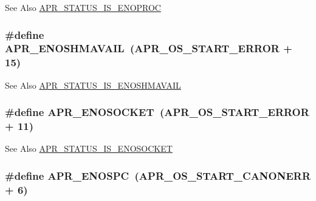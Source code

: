 \begin{DoxySeeAlso}{See Also}
\hyperlink{group___a_p_r___s_t_a_t_u_s___i_s_ga566f4c9b9db8a0c31199a938bdc4e38a}{A\-P\-R\-\_\-\-S\-T\-A\-T\-U\-S\-\_\-\-I\-S\-\_\-\-E\-N\-O\-P\-R\-O\-C} 
\end{DoxySeeAlso}
\hypertarget{group___a_p_r___error_ga67516f4e87197490333480a8bbc78725}{
\subsubsection[{A\-P\-R\-\_\-\-E\-N\-O\-S\-H\-M\-A\-V\-A\-I\-L}]{\setlength{\rightskip}{0pt plus 5cm}\#define A\-P\-R\-\_\-\-E\-N\-O\-S\-H\-M\-A\-V\-A\-I\-L~({\bf A\-P\-R\-\_\-\-O\-S\-\_\-\-S\-T\-A\-R\-T\-\_\-\-E\-R\-R\-O\-R} + 15)}}\label{group___a_p_r___error_ga67516f4e87197490333480a8bbc78725}
\begin{DoxySeeAlso}{See Also}
\hyperlink{group___a_p_r___s_t_a_t_u_s___i_s_ga99af86378a3ac8eb5a59f1acffec6440}{A\-P\-R\-\_\-\-S\-T\-A\-T\-U\-S\-\_\-\-I\-S\-\_\-\-E\-N\-O\-S\-H\-M\-A\-V\-A\-I\-L} 
\end{DoxySeeAlso}
\hypertarget{group___a_p_r___error_ga99e125e203a1d44f12bd88b41696716d}{
\subsubsection[{A\-P\-R\-\_\-\-E\-N\-O\-S\-O\-C\-K\-E\-T}]{\setlength{\rightskip}{0pt plus 5cm}\#define A\-P\-R\-\_\-\-E\-N\-O\-S\-O\-C\-K\-E\-T~({\bf A\-P\-R\-\_\-\-O\-S\-\_\-\-S\-T\-A\-R\-T\-\_\-\-E\-R\-R\-O\-R} + 11)}}\label{group___a_p_r___error_ga99e125e203a1d44f12bd88b41696716d}
\begin{DoxySeeAlso}{See Also}
\hyperlink{group___a_p_r___s_t_a_t_u_s___i_s_gae415d3119f7b13edc8af627a5e3f440b}{A\-P\-R\-\_\-\-S\-T\-A\-T\-U\-S\-\_\-\-I\-S\-\_\-\-E\-N\-O\-S\-O\-C\-K\-E\-T} 
\end{DoxySeeAlso}
\hypertarget{group___a_p_r___error_ga1dfc0bbf080f17b0b9010ef967542193}{
\subsubsection[{A\-P\-R\-\_\-\-E\-N\-O\-S\-P\-C}]{\setlength{\rightskip}{0pt plus 5cm}\#define A\-P\-R\-\_\-\-E\-N\-O\-S\-P\-C~({\bf A\-P\-R\-\_\-\-O\-S\-\_\-\-S\-T\-A\-R\-T\-\_\-\-C\-A\-N\-O\-N\-E\-R\-R} + 6)}}\label{group___a_p_r___error_ga1dfc0bbf080f17b0b9010ef967542193}
